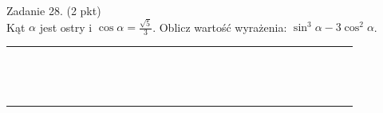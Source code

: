 \documentclass[10pt]{article}
\begin{document}
Zadanie 28. (2 pkt)\\
Kąt \(\alpha\) jest ostry i \(\cos \alpha=\frac{\sqrt{5}}{3}\). Oblicz wartość wyrażenia: \(\sin ^{3} \alpha-3 \cos ^{2} \alpha\).

\begin{center}
\begin{tabular}{|c|c|c|c|c|c|c|c|c|c|c|c|c|c|c|c|c|c|c|c|c|c|c|c|c|c|c|c|c|c|c|}
\hline
 &  &  &  &  &  &  &  &  &  &  &  &  &  &  &  &  &  &  &  &  &  &  &  &  &  &  &  &  &  &  \\
\hline
 &  &  &  &  &  &  &  &  &  &  &  &  &  &  &  &  &  &  &  &  &  &  &  &  &  &  &  &  &  &  \\
\hline
 &  &  &  &  &  &  &  &  &  &  &  &  &  &  &  &  &  &  &  &  &  &  &  &  &  &  &  &  &  &  \\
\hline
 &  &  &  &  &  &  &  &  &  &  &  &  &  &  &  &  &  &  &  &  &  &  &  &  &  &  &  &  &  &  \\
\hline
 &  &  &  &  &  &  &  &  &  &  &  &  &  &  &  &  &  &  &  &  &  &  &  &  &  &  &  &  &  &  \\
\hline
 &  &  &  &  &  &  &  &  &  &  &  &  &  &  &  &  &  &  &  &  &  &  &  &  &  &  &  &  &  &  \\
\hline
 &  &  &  &  &  &  &  &  &  &  &  &  &  &  &  &  &  &  &  &  &  &  &  &  &  &  &  &  &  &  \\
\hline
 &  &  &  &  &  &  &  &  &  &  &  &  &  &  &  &  &  &  &  &  &  &  &  &  &  &  &  &  &  &  \\
\hline
 &  &  &  &  &  &  &  &  &  &  &  &  &  &  &  &  &  &  &  &  &  &  &  &  &  &  &  &  &  &  \\
\hline
 &  &  &  &  &  &  &  &  &  &  &  &  &  &  &  &  &  &  &  &  &  &  &  &  &  &  &  &  &  &  \\
\hline
 &  &  &  &  &  &  &  &  &  &  &  &  &  &  &  &  &  &  &  &  &  &  &  &  &  &  &  &  &  &  \\
\hline
 &  &  &  &  &  &  &  &  &  &  &  &  &  &  &  &  &  &  &  &  &  &  &  &  &  &  &  &  &  &  \\
\hline
 &  &  &  &  &  &  &  &  &  &  &  &  &  &  &  &  &  &  &  &  &  &  &  &  &  &  &  &  &  &  \\
\hline
 &  &  &  &  &  &  &  &  &  &  &  &  &  &  &  &  &  &  &  &  &  &  &  &  &  &  &  &  &  &  \\
\hline
 &  &  &  &  &  &  &  &  &  &  &  &  &  &  &  &  &  &  &  &  &  &  &  &  &  &  &  &  &  &  \\
\hline

\end{tabular}
\end{center}
\end{document}
